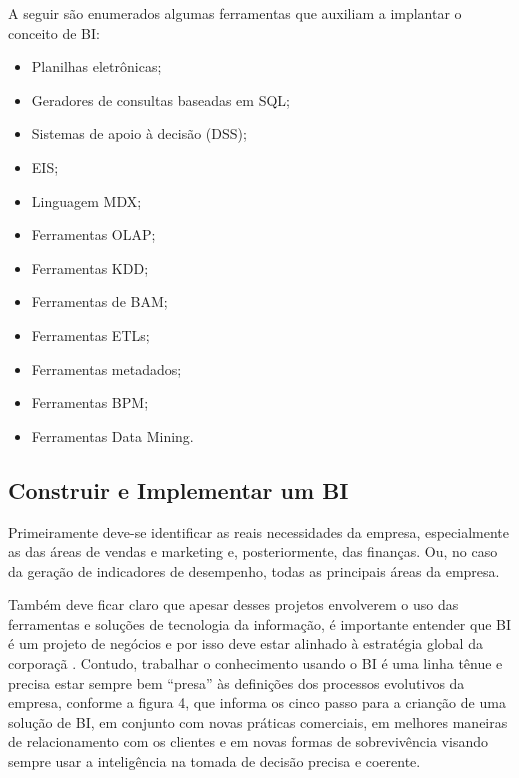A seguir são enumerados algumas ferramentas que auxiliam a implantar o conceito de BI:

\begin{itemize}
    \item Planilhas eletrônicas;
    \item Geradores de consultas baseadas em SQL;
    \item Sistemas de apoio à decisão (DSS);
    \item EIS;
    \item Linguagem MDX;
    \item Ferramentas OLAP;
    \item Ferramentas KDD;
    \item Ferramentas de BAM;
    \item Ferramentas ETLs;
    \item Ferramentas metadados;
    \item Ferramentas BPM;
    \item Ferramentas Data Mining.
\end{itemize}

\subsection{Construir e Implementar um BI}

Primeiramente deve-se identificar as reais necessidades da empresa, especialmente as das áreas de vendas e marketing e, posteriormente, das finanças. Ou, no caso da geração de indicadores de desempenho, todas as principais áreas da empresa. 

Também deve ficar claro que apesar desses projetos envolverem o uso das ferramentas e soluções de tecnologia da informação, é importante entender que BI é um projeto de negócios e por isso deve estar alinhado à estratégia global da corporaçã
.
Contudo, trabalhar o conhecimento usando o BI é uma linha tênue e precisa estar sempre bem “presa” às definições dos processos evolutivos da empresa, conforme a figura 4, que informa os cinco passo para a crian\c{c}\~{a}o de uma solu\c{c}\~{a}o de BI, em conjunto com novas práticas comerciais, em melhores maneiras de relacionamento com os clientes e em novas formas de sobrevivência visando sempre usar a inteligência na tomada de decisão precisa e coerente.

